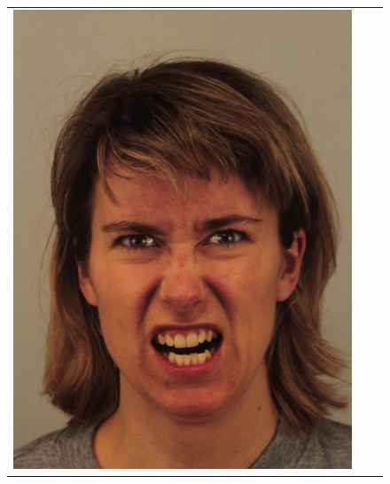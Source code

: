 \begin{figure}[H]
\begin{tabular}[t]{ccc}
   \includegraphics[scale=0.2]{Chapter4/Figs/MissedAnger}
         &

\end{tabular}
\end{figure}
